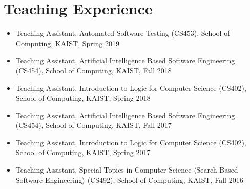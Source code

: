 \documentclass[letterpaper,11pt]{article}
\begin{document}
\section{Teaching Experience}
\begin{itemize}
  \item Teaching Assistant, Automated Software Testing (CS453), School of Computing, KAIST, Spring 2019
  \item Teaching Assistant, Artificial Intelligence Based Software Engineering (CS454), School of Computing, KAIST, Fall 2018
  \item Teaching Assistant, Introduction to Logic for Computer Science (CS402), School of Computing, KAIST, Spring 2018
  \item Teaching Assistant, Artificial Intelligence Based Software Engineering (CS454), School of Computing, KAIST, Fall 2017
  \item Teaching Assistant, Introduction to Logic for Computer Science (CS402), School of Computing, KAIST, Spring 2017
  \item Teaching Assistant, Special Topics in Computer Science $\langle$Search Based Software Engineering$\rangle$ (CS492), School of Computing, KAIST, Fall 2016

\end{itemize}
\end{document}

